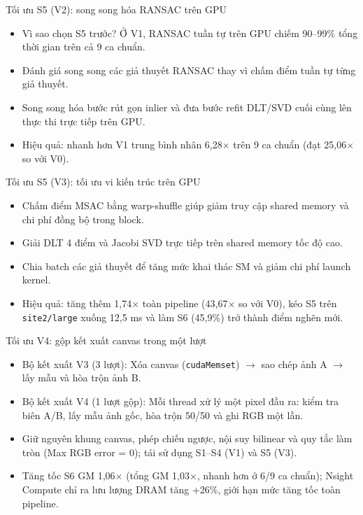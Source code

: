 \documentclass[aspectratio=169]{beamer}
\begin{document}
\begin{frame}{Tối ưu S5 (V2): song song hóa RANSAC trên GPU}
\begin{itemize}
\item Vì sao chọn S5 trước? Ở V1, RANSAC tuần tự trên GPU chiếm 90--99\% tổng thời gian trên cả 9 ca chuẩn.
\item Đánh giá song song các giả thuyết RANSAC thay vì chấm điểm tuần tự từng giả thuyết.
\item Song song hóa bước rút gọn inlier và đưa bước refit DLT/SVD cuối cùng lên thực thi trực tiếp trên GPU.
\item Hiệu quả: nhanh hơn V1 trung bình nhân 6,28$\times$ trên 9 ca chuẩn (đạt 25,06$\times$ so với V0).
\end{itemize}
\end{frame}

\begin{frame}{Tối ưu S5 (V3): tối ưu vi kiến trúc trên GPU}
\begin{itemize}
\item Chấm điểm MSAC bằng warp-shuffle giúp giảm truy cập shared memory và chi phí đồng bộ trong block.
\item Giải DLT 4 điểm và Jacobi SVD trực tiếp trên shared memory tốc độ cao.
\item Chia batch các giả thuyết để tăng mức khai thác SM và giảm chi phí launch kernel.
\item Hiệu quả: tăng thêm 1,74$\times$ toàn pipeline (43,67$\times$ so với V0), kéo S5 trên \texttt{site2/large} xuống 12,5 ms và làm S6 (45,9\%) trở thành điểm nghẽn mới.
\end{itemize}
\end{frame}

\begin{frame}{Tối ưu V4: gộp kết xuất canvas trong một lượt}
\begin{itemize}
\item Bộ kết xuất V3 (3 lượt): Xóa canvas (\texttt{cudaMemset}) $\rightarrow$ sao chép ảnh A $\rightarrow$ lấy mẫu và hòa trộn ảnh B.
\item Bộ kết xuất V4 (1 lượt gộp): Mỗi thread xử lý một pixel đầu ra: kiểm tra biên A/B, lấy mẫu ảnh gốc, hòa trộn 50/50 và ghi RGB một lần.
\item Giữ nguyên khung canvas, phép chiếu ngược, nội suy bilinear và quy tắc làm tròn (Max RGB error = 0); tái sử dụng S1--S4 (V1) và S5 (V3).
\item Tăng tốc S6 GM 1,06$\times$ (tổng GM 1,03$\times$, nhanh hơn ở 6/9 ca chuẩn); Nsight Compute chỉ ra lưu lượng DRAM tăng +26\%, giới hạn mức tăng tốc toàn pipeline.
\end{itemize}
\end{frame}
\end{document}
